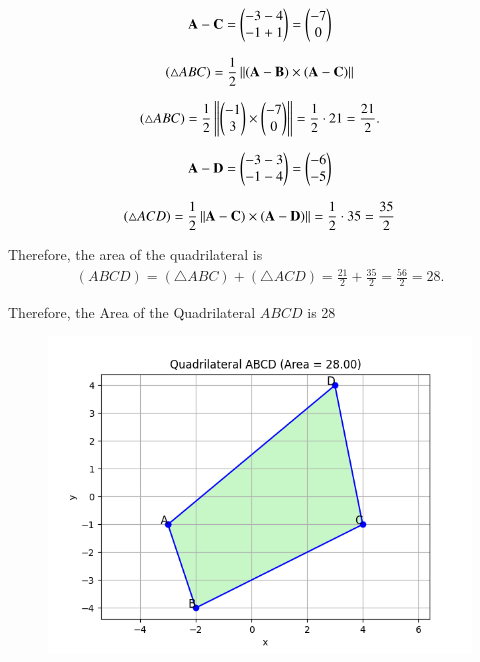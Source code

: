 \documentclass[journal]{IEEEtran}
\begin{document}
\begin{align}
\vec{A} - \vec{C} = \myvec{-3-4 \\ -1+1} = \myvec{-7 \\ 0}
\end{align}



\begin{align}
(\triangle ABC)=\frac{1}{2}\norm{(\vec{A}-\vec{B}) \times (\vec{A}-\vec{C})}
\end{align}

\begin{align}
(\triangle ABC)=\frac{1}{2}\norm{\myvec{-1 \\ 3} \times \myvec{-7 \\ 0}}=\frac{1}{2}\cdot 21=\frac{21}{2}.
\end{align}


\begin{align}
\vec{A}-\vec{D}
=\myvec{-3-3 \\ -1-4} = \myvec{-6 \\ -5}  
\end{align}





\begin{align}
(\triangle ACD)=\frac{1}{2}\norm{\vec{A}-\vec{C}) \times (\vec{A}-\vec{D})}=\frac12\cdot 35=\frac{35}{2}
\end{align}

Therefore, the area of the quadrilateral is
\begin{align}
(ABCD)=(\triangle ABC)+(\triangle ACD)
=\tfrac{21}{2}+\tfrac{35}{2}=\tfrac{56}{2}=28.
\end{align}

Therefore, the Area of the Quadrilateral $ABCD$ is 28



\begin{figure}[h!]
    \centering
    \includegraphics[height=0.5\textheight, keepaspectratio]{figs/Figure_1.png}
    \label{figure_1}
\end{figure}
\end{document}
